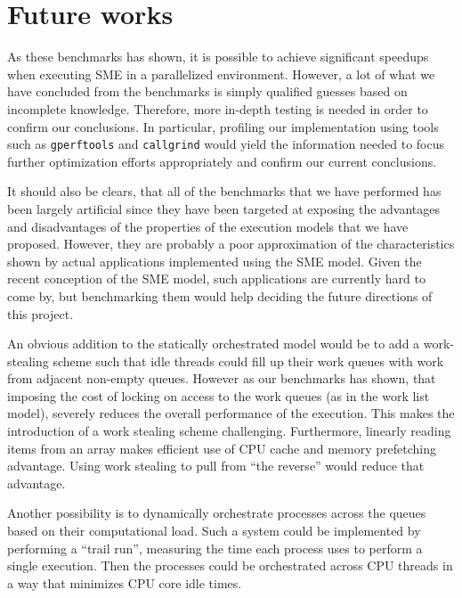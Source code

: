 \section{Future works}
As these benchmarks has shown, it is possible to achieve significant
speedups when executing SME in a parallelized environment. However, a
lot of what we have concluded from the benchmarks is simply qualified
guesses based on incomplete knowledge. Therefore, more in-depth
testing is needed in order to confirm our conclusions. In particular,
profiling our implementation using tools such as \texttt{gperftools}
and \texttt{callgrind} would yield the information needed to focus
further optimization efforts appropriately and confirm our current
conclusions.

It should also be clears, that all of the benchmarks that we have
performed has been largely artificial since they have been targeted at
exposing the advantages and disadvantages of the properties of the
execution models that we have proposed. However, they are probably a
poor approximation of the characteristics shown by actual applications
implemented using the SME model. Given the recent conception of the
SME model, such applications are currently hard to come by, but
benchmarking them would help deciding the future directions of this
project.

An obvious addition to the statically orchestrated model would be to
add a work-stealing\cite{blumofe1999scheduling} scheme such that idle
threads could fill up their work queues with work from adjacent
non-empty queues. However as our benchmarks has shown, that imposing
the cost of locking on access to the work queues (as in the work list
model), severely reduces the overall performance of the
execution. This makes the introduction of a work stealing scheme
challenging. Furthermore, linearly reading items from an array makes
efficient use of CPU cache and memory prefetching advantage. Using
work stealing to pull from ``the reverse'' would reduce that
advantage.


Another possibility is to dynamically orchestrate processes across the
queues based on their computational load. Such a system could be
implemented by performing a "`trail run"', measuring the time each
process uses to perform a single execution. Then the processes could be
orchestrated across CPU threads in a way that minimizes CPU core idle
times.

